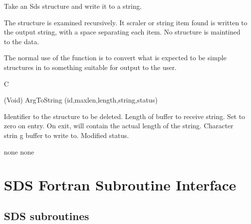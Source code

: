 \begin{manroutinedescription}
	Take an Sds structure and write it to a string.

	The structure is examined recursively.  It scraler or string
	item found is written to the output string, with a space
	separating each item.  No structure is maintined to the data.

	The normal use of the function is to convert what is expected to
	be simple structures in to something suitable for output to the
	user.
 

      C

      (Void) {\mantt{=}} ArgToString (id,maxlen,length,string,status)

\begin{manparametertable}
 Identifier to the structure to %
be deleted.
   Length of buffer to receive %
string.
	Set to zero on entry.  %
On exit, will
			    contain the actual length of the string.
 Character strin g %
buffer to write to.
 Modified status.

\end{manparametertable}
      none
      none

\end{manroutinedescription}




\newpage
\section{SDS Fortran Subroutine Interface}
\label{SDS-fortran-interface}

\subsection{SDS subroutines}

